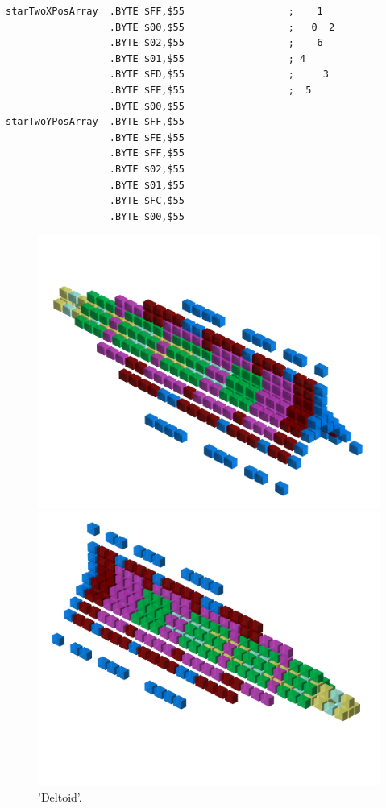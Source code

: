 \begin{lstlisting}
starTwoXPosArray  .BYTE $FF,$55                  ;    1  
                  .BYTE $00,$55                  ;   0  2
                  .BYTE $02,$55                  ;    6  
                  .BYTE $01,$55                  ; 4     
                  .BYTE $FD,$55                  ;     3 
                  .BYTE $FE,$55                  ;  5    
                  .BYTE $00,$55
starTwoYPosArray  .BYTE $FF,$55
                  .BYTE $FE,$55
                  .BYTE $FF,$55
                  .BYTE $02,$55
                  .BYTE $01,$55
                  .BYTE $FC,$55
                  .BYTE $00,$55
\end{lstlisting}

\clearpage
\clearpage

\begin{figure}[H]
    \centering
    \begin{adjustbox}{width=12cm,center}
      \includegraphics[width=12cm]{src/patterns/pattern4-45.png}%
    \end{adjustbox}
    \begin{adjustbox}{width=12cm,margin=0cm -4cm}
      \includegraphics[width=12cm]{src/patterns/pattern4-225.png}%
    \end{adjustbox}
\caption{'Deltoid'.}
\end{figure}
\clearpage

